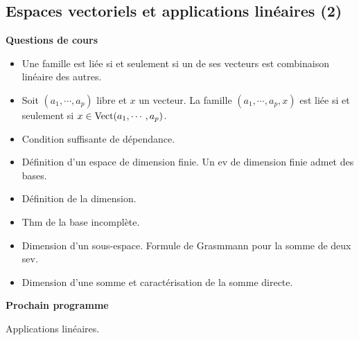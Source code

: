 





\subsection{Espaces vectoriels et applications linéaires (2)}



\bigskip
\begin{center}
 \textbf{Questions de cours}
\end{center}
\begin{itemize}
 \item Une famille est liée si et seulement si un de ses vecteurs est combinaison linéaire des autres.
 \item Soit $(a_1,\cdots,a_p)$ libre et $x$ un vecteur. La famille $(a_1,\cdots,a_p,x)$ est liée si et seulement si $x\in \mathop{\mathrm{Vect}}(a_1,\cdots,a_p)$.
 \item Condition suffisante de dépendance.
 \item Définition d'un espace de dimension finie. Un ev de dimension finie admet des bases.
 \item Définition de la dimension.
 \item Thm de la base incomplète.
 \item Dimension d'un sous-espace. Formule de Grasmmann pour la somme de deux sev.
 \item Dimension d'une somme et caractérisation de la somme directe.
\end{itemize}


\begin{center}
 \textbf{Prochain programme}
\end{center}
Applications linéaires.

